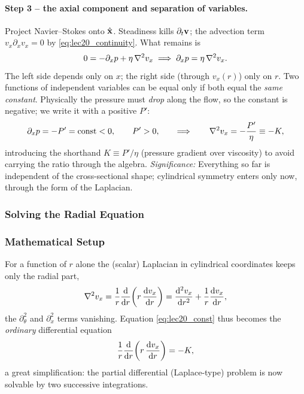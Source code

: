 \documentclass[../main.tex]{subfiles}
\begin{document}
\paragraph{Step 3 -- the axial component and separation of variables.} Project Navier--Stokes onto $\hat{\mathbf{x}}$. Steadiness kills $\partial_t\mathbf{v}$; the advection term $v_x\partial_x v_x=0$ by \eqref{eq:lec20_continuity}. What remains is
\begin{equation}
  0=-\partial_x p+\eta\,\nabla^2 v_x \;\Longrightarrow\; \partial_x p=\eta\,\nabla^2 v_x .
  \label{eq:lec20_separation}
\end{equation}
The left side depends only on $x$; the right side (through $v_x(r)$) only on $r$. Two functions of independent variables can be equal only if both equal the \emph{same constant}. Physically the pressure must \emph{drop} along the flow, so the constant is negative; we write it with a positive $P'$:
\begin{equation}
  \partial_x p=-P'=\text{const}<0,\qquad P'>0,
  \qquad\Longrightarrow\qquad
  \nabla^2 v_x=-\frac{P'}{\eta}\equiv -K,
  \label{eq:lec20_const}
\end{equation}
introducing the shorthand $K\equiv P'/\eta$ (pressure gradient over viscosity) to avoid carrying the ratio through the algebra.
\textit{Significance:} Everything so far is independent of the cross-sectional shape; cylindrical symmetry enters only now, through the form of the Laplacian.

\subsubsection{Solving the Radial Equation}\label{sec:lec20:radial}

\subsubsection*{Mathematical Setup}
For a function of $r$ alone the (scalar) Laplacian in cylindrical coordinates keeps only the radial part,
\begin{equation}
  \nabla^2 v_x=\frac{1}{r}\dv{r}\!\left(r\,\dv{v_x}{r}\right)
  =\dv[2]{v_x}{r}+\frac1r\dv{v_x}{r},
  \label{eq:lec20_cyl_lapl}
\end{equation}
the $\partial_\theta^2$ and $\partial_x^2$ terms vanishing. Equation \eqref{eq:lec20_const} thus becomes the \emph{ordinary} differential equation
\begin{equation}
  \frac1r\dv{r}\!\left(r\,\dv{v_x}{r}\right)=-K ,
  \label{eq:lec20_ode}
\end{equation}
a great simplification: the partial differential (Laplace-type) problem is now solvable by two successive integrations.
\end{document}

